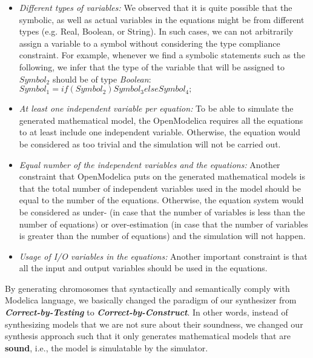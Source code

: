 \begin{itemize}
    \item \textit{Different types of variables:} We observed that it is quite possible that the symbolic, as well as actual variables in the equations might be from different types (e.g. Real, Boolean, or String). In such cases, we can not arbitrarily assign a variable to a symbol without considering the type compliance constraint. For example, whenever we find a symbolic statements such as the following, we infer that the type of the variable that will be assigned to $Symbol_2$ should be of type \textit{Boolean}:
    $Symbol_1 = if(Symbol_2) Symbol_3 else Symbol_4;$
    \item \textit{At least one independent variable per equation:} To be able to simulate the generated mathematical model, the OpenModelica requires all the equations to at least include one independent variable. Otherwise, the equation would be considered as too trivial and the simulation will not be carried out. 
    \item \textit{Equal number of the independent variables and the equations:} Another constraint that OpenModelica puts on the generated mathematical models is that the total number of independent variables used in the model should be equal to the number of the equations. Otherwise, the equation system would be considered as under- (in case that the number of variables is less than the number of equations) or over-estimation (in case that the number of variables is greater than the number of equations) and the simulation will not happen.
    \item \textit{Usage of I/O variables in the equations:} Another important constraint is that all the input and output variables should be used in the equations.  
\end{itemize}

By generating chromosomes that syntactically and semantically comply with Modelica language, we basically changed the paradigm of our synthesizer from \textbf{\textit{Correct-by-Testing}} to \textbf{\textit{Correct-by-Construct}}. In other words, instead of synthesizing models that we are not sure about their soundness, we changed our synthesis approach such that it only generates mathematical models that are \textbf{sound}, i.e., the model is simulatable by the simulator. 